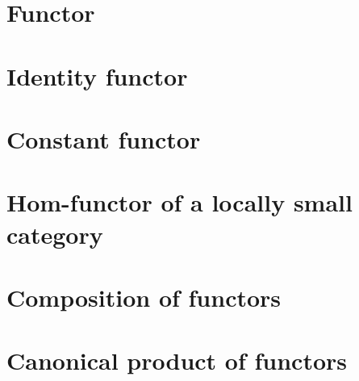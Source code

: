 \section{Functor}
    
\section{Identity functor}
    
\section{Constant functor}
    
\section{Hom-functor of a locally small category}
    
\section{Composition of functors}
    
\section{Canonical product of functors}
    
